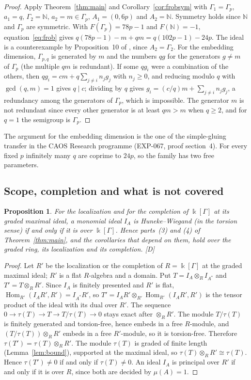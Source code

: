 \documentclass[11pt]{article}
\newtheorem{proposition}[theorem]{Proposition}
\theoremstyle{definition}
\theoremstyle{remark}
\newcommand{\N}{\mathbb{N}}
\newcommand{\kk}{\Bbbk}
\newcommand{\tor}{\tau}
\newcommand{\mD}{\emph{[D]}}
\begin{document}
\begin{proof}
Apply Theorem~\ref{thm:main} and Corollary~\ref{cor:frobsym} with $\Gamma_1=\Gamma_p$, $a_1=q$, $\Gamma_2=\N$, $a_2=m\in\Gamma_p$,
$A_1=(0,6p)$ and $A_2=\N$. Symmetry holds since $\N$ and $\Gamma_p$ are symmetric. With $F(\Gamma_p)=78p-1$ and $F(\N)=-1$,
equation~\eqref{eq:frob} gives $q(78p-1)-m+qm=q(102p-1)-24p$. The ideal is a counterexample by Proposition~10 of
\cite{GarciaSanchezLeamer2013}, since $A_2=\Gamma_2$. For the embedding dimension, $\Gamma_{p,q}$ is generated by $m$ and the
numbers $qg$ for the generators $g\ne m$ of $\Gamma_p$ (the multiple $qm$ is redundant). If some $qg_i$ were a combination of the others, then
$qg_i=cm+q\sum_{j\ne i}n_jg_j$ with $n_j\ge0$, and reducing modulo $q$ with $\gcd(q,m)=1$ gives $q\mid c$; dividing by $q$ gives
$g_i=(c/q)m+\sum_{j\ne i}n_jg_j$, a redundancy among the generators of $\Gamma_p$, which is impossible. The generator $m$ is not
redundant since every other generator is at least $qm>m$ when $q\ge2$, and for $q=1$ the semigroup is $\Gamma_p$.
\end{proof}

The argument for the embedding dimension is the one of the simple-gluing transfer in the CAOS Research programme (EXP-067, proof section~4). For every fixed
$p$ infinitely many $q$ are coprime to $24p$, so the family has two free parameters.

\subsection{Scope, completion and what is not covered}

\begin{proposition}\label{prop:completion}
For the localization and for the completion of $\kk[\Gamma]$ at its graded maximal ideal, a monomial ideal $I_A$ is
Huneke--Wiegand (in the torsion sense) if and only if it is over $\kk[\Gamma]$. Hence parts~(3) and (4) of
Theorem~\ref{thm:main}, and the corollaries that depend on them, hold over the graded ring, its localization and its
completion. \mD{}
\end{proposition}

\begin{proof}
Let $R'$ be the localization or the completion of $R=\kk[\Gamma]$ at the graded maximal ideal; $R'$ is a flat $R$-algebra and a domain. Put $T=I_A\otimes_RI_{A^*}$ and $T'=T\otimes_RR'$. Since $I_A$ is finitely presented and $R'$ is flat, $\operatorname{Hom}_{R'}(I_AR',R')=I_{A^*}R'$, so $T'=I_AR'\otimes_{R'}\operatorname{Hom}_{R'}(I_AR',R')$ is the tensor product of the ideal with its dual over $R'$. The sequence $0\to\tor(T)\to T\to T/\tor(T)\to0$ stays exact after $\otimes_RR'$. The module $T/\tor(T)$ is finitely generated and torsion-free, hence embeds in a free $R$-module, and $(T/\tor(T))\otimes_RR'$ embeds in a free $R'$-module, so it is torsion-free. Therefore $\tor(T')=\tor(T)\otimes_RR'$. The module $\tor(T)$ is graded of finite length (Lemma~\ref{lem:bound}), supported at the maximal ideal, so $\tor(T)\otimes_RR'\cong\tor(T)$. Hence $\tor(T')\ne0$ if and only if $\tor(T)\ne0$. An ideal $I_A$ is principal over $R'$ if and only if it is over $R$, since both are decided by $\mu(A)=1$.
\end{proof}
\end{document}
